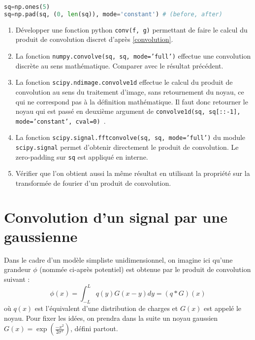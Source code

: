 \documentclass[a4paper, 12pt]{article}
\begin{document}
\begin{lstlisting}[language=Python]
sq=np.ones(5)
sq=np.pad(sq, (0, len(sq)), mode='constant') # (before, after)
\end{lstlisting}
 
 \begin{enumerate} 
\item Développer une fonction python {\tt conv(f, g)} permettant de faire le calcul du produit de convolution discret d'après
\eqref{convolution}.

\item La fonction {\tt  numpy.convolve(sq, sq, mode='full')} effectue une convolution discrète au sens mathématique.
Comparer avec le résultat précédent.

\item La fonction {\tt  scipy.ndimage.convolve1d} effectue le calcul du produit de convolution au sens du traitement d'image, sans retournement du noyau, ce qui ne correspond pas à la définition mathématique. Il faut donc retourner le noyau qui est passé en deuxième argument de {\tt convolve1d(sq, sq[::-1], mode='constant', cval=0) }.

\item La fonction {\tt scipy.signal.fftconvolve(sq, sq, mode='full')} du module \break
{\tt scipy.signal} permet d'obtenir directement le produit de convolution. Le zero-padding sur {\tt sq} est appliqué en interne. 

\item Vérifier que l'on obtient aussi la même résultat en utilisant la propriété sur la transformée de fourier d'un produit de convolution.
 \end{enumerate} 
 
\section{Convolution d'un signal par une gaussienne}

Dans le cadre d'un modèle simpliste unidimensionnel, on imagine ici qu'une grandeur $\phi$ (nommée ci-après potentiel) est obtenue par 
le produit de convolution suivant :
\begin{equation}
\phi(x)=\int_{-L}^{L} q(y) G(x-y) dy = (q*G) (x)
\end{equation}
où $q(x)$ est l'équivalent d'une distribution de charges et $G(x)$ est appelé le noyau.
Pour fixer les idées, on prendra dans la suite un noyau gaussien $G(x)=\exp(\frac{-x^2}{2 \sigma^2})$, défini partout.
\end{document}
